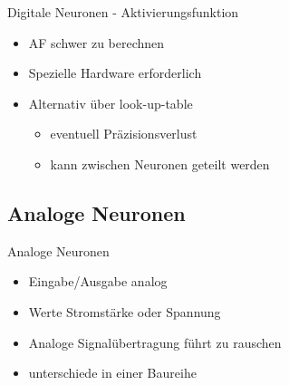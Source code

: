 \documentclass[handout]{beamer}
\begin{document}
    \begin{frame}{Digitale Neuronen - Aktivierungsfunktion}
        \begin{itemize}[<+->]
            \item AF schwer zu berechnen
            \item Spezielle Hardware erforderlich
            \item Alternativ über look-up-table
            \begin{itemize}
                \item eventuell Präzisionsverlust
                \item kann zwischen Neuronen geteilt werden
            \end{itemize}
        \end{itemize}
    \end{frame}

    \subsection{Analoge Neuronen}

    \begin{frame}{Analoge Neuronen}
        \begin{itemize}[<+->]
            \item Eingabe/Ausgabe analog
            \item Werte Stromstärke oder Spannung
            \item Analoge Signalübertragung führt zu rauschen
            \item unterschiede in einer Baureihe
        \end{itemize}
    \end{frame}
\end{document}
